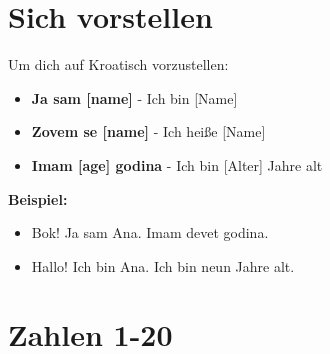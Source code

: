 \section{Sich vorstellen}

\begin{grammar}
Um dich auf Kroatisch vorzustellen:

\begin{itemize}
    \item \textbf{Ja sam [name]} - Ich bin [Name]
    \item \textbf{Zovem se [name]} - Ich heiße [Name]
    \item \textbf{Imam [age] godina} - Ich bin [Alter] Jahre alt
\end{itemize}
\end{grammar}

\textbf{Beispiel:}
\begin{itemize}
    \item Bok! Ja sam Ana. Imam devet godina.
    \item Hallo! Ich bin Ana. Ich bin neun Jahre alt.
\end{itemize}

\section{Zahlen 1-20}

